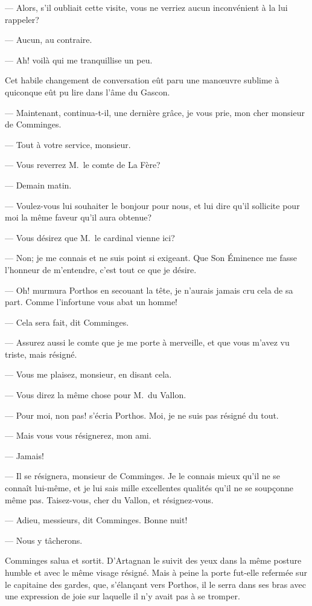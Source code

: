— Alors, s'il oubliait cette visite, vous ne verriez aucun inconvénient à la lui rappeler?

— Aucun, au contraire.

— Ah! voilà qui me tranquillise un peu.

Cet habile changement de conversation eût paru une manœuvre sublime à quiconque eût pu lire dans l'âme du Gascon.

— Maintenant, continua-t-il, une dernière grâce, je vous prie, mon cher monsieur de Comminges.

— Tout à votre service, monsieur.

— Vous reverrez M.~le comte de La Fère?

— Demain matin.

— Voulez-vous lui souhaiter le bonjour pour nous, et lui dire qu'il sollicite pour moi la même faveur qu'il aura obtenue?

— Vous désirez que M.~le cardinal vienne ici?

— Non; je me connais et ne suis point si exigeant. Que Son Éminence me fasse l'honneur de m'entendre, c'est tout ce que je désire.

— Oh! murmura Porthos en secouant la tête, je n'aurais jamais cru cela de sa part. Comme l'infortune vous abat un homme!

— Cela sera fait, dit Comminges.

— Assurez aussi le comte que je me porte à merveille, et que vous m'avez vu triste, mais résigné.

— Vous me plaisez, monsieur, en disant cela.

— Vous direz la même chose pour M.~du Vallon.

— Pour moi, non pas! s'écria Porthos. Moi, je ne suis pas résigné du tout.

— Mais vous vous résignerez, mon ami.

— Jamais!

— Il se résignera, monsieur de Comminges. Je le connais mieux qu'il ne se connaît lui-même, et je lui sais mille excellentes qualités qu'il ne se soupçonne même pas. Taisez-vous, cher du Vallon, et résignez-vous.

— Adieu, messieurs, dit Comminges. Bonne nuit!

— Nous y tâcherons.

Comminges salua et sortit. D'Artagnan le suivit des yeux dans la même posture humble et avec le même visage résigné. Mais à peine la porte fut-elle refermée sur le capitaine des gardes, que, s'élançant vers Porthos, il le serra dans ses bras avec une expression de joie sur laquelle il n'y avait pas à se tromper.


